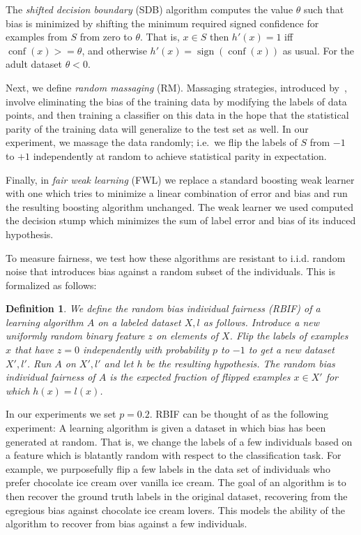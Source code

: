 \documentclass{article}
\DeclareMathOperator{\sign}{sign}
\DeclareMathOperator{\conf}{conf}
\newtheorem{definition}{Definition}
\begin{document}
The \emph{shifted decision boundary} (SDB) algorithm computes the value
$\theta$ such that bias is minimized by shifting the minimum required signed
confidence for examples from $S$ from zero to $\theta$. That is, $x \in S$ then
$h'(x) = 1$ iff $\conf(x) >= \theta$, and otherwise $h'(x) = \sign(\conf(x))$
as usual. For the adult dataset $\theta < 0$.

Next, we define \emph{random massaging} (RM).  Massaging strategies, introduced
by~\citet{KamiranC09}, involve eliminating the bias of the training data by
modifying the labels of data points, and then training a classifier on this
data in the hope that the statistical parity of the training data will
generalize to the test set as well.  In our experiment, we massage the data
randomly; i.e.~we flip the labels of $S$ from $-1$ to $+1$ independently at
random to achieve statistical parity in expectation.

Finally, in \emph{fair weak learning} (FWL) we replace a standard boosting weak
learner with one which tries to minimize a linear combination of error and bias
and run the resulting boosting algorithm unchanged. The weak learner we used
computed the decision stump which minimizes the sum of label error and bias of
its induced hypothesis.

To measure fairness, we test how these algorithms are resistant to i.i.d.
random noise that introduces bias against a random subset of the individuals.
This is formalized as follows:

\begin{definition}
We define the \emph{random bias individual fairness} (RBIF) of a learning
algorithm $A$ on a labeled dataset $X,l$ as follows. Introduce a new uniformly
random binary feature $z$ on elements of $X$. Flip the labels of examples $x$
that have $z=0$ independently with probability $p$ to $-1$ to get a new dataset
$X', l'$. Run $A$ on $X', l'$ and let $h$ be the resulting hypothesis. The
random bias individual fairness of $A$ is the expected fraction of flipped
examples $x \in X'$ for which $h(x) = l(x)$.  
\end{definition}

In our experiments we set $p = 0.2$.  RBIF can be thought of as the following
experiment:  A learning algorithm is given a dataset in which bias has been
generated at random.  That is, we change the labels of a few
individuals based on a feature which is blatantly random with respect to the
classification task.  For example, we purposefully flip a few labels in the
data set of individuals who prefer chocolate ice cream over vanilla ice cream.
The goal of an algorithm is to then recover the ground truth labels in the
original dataset, recovering from the egregious bias against chocolate ice
cream lovers.  This models the ability of the algorithm to recover from bias
against a few individuals.
\end{document}
